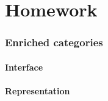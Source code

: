 \part{Homework}













\section{Enriched categories}

\subsection*{Interface}


\subsection*{Representation}



